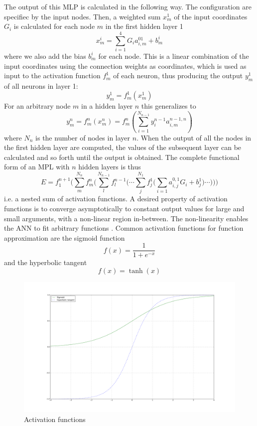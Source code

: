 \documentclass[twoside,english]{uiofysmaster}
\begin{document}
The output of this MLP is calculated in the following way. The configuration are specifiec by the input nodes.
Then, a weighted sum $x_m^1$ of the input coordinates ${G_i}$ is calculated for each node $m$ in the first hidden layer 1
\begin{equation}
 x_m^i = \sum_{i=1}^4 G_i a_{i,m}^{01} + b_m^i 
\end{equation}
where we also add the bias $b_m^i$ for each node. This is a linear combination of the input coordinates
using the connection weights as coordinates, which is used as input to the activation function $f_m^1$ of each neuron, thus
producing the output $y_m^1$ of all neurons in layer 1:
\begin{equation}
 y_m^1 = f_m^1(x_m^1)
\end{equation}
For an arbitrary node $m$ in a hidden layer $n$ this generalizes to
\begin{equation}
 y_m^n = f_m^n(x_m^n) = f_m^n\left(\sum_{i=1}^{N_{n-1}} y_i^{n-1}a_{i,m}^{n-1,n}\right)
\end{equation}
where $N_n$ is the number of nodes in layer $n$. When the output of all the nodes in the first hidden layer are computed,
the values of the subsequent layer can be calculated and so forth until the output is obtained. The complete functional form
of an MPL with $n$ hidden layers is thus
\begin{equation}
 E = f_1^{n+1}\biggr(\sum_m^{N_n}f_m^{n}\biggr(\sum_l^{N_{n-1}}f_l^{n-1}\biggr( \cdots \sum_j^{N_1} 
     f_j^1\biggr(\sum_{i=1}a_{i,j}^{0,1}G_i + b_j^1\biggr) \cdots \biggr)\biggr)\biggr)
     \label{completeNN}
\end{equation}
i.e. a nested sum of activation functions. A desired property of activation functions is to converge asymptotically
to constant output values for large and small arguments, with a non-linear region in-between. The non-linearity enables
the ANN to fit arbitrary functions \cite{Hornik89}. Common activation functions \cite{Rojas96} for 
function approximation are the sigmoid function
\begin{equation}
 f(x) = \frac{1}{1 + e^{-x}}
 \label{sigmoidActivationFunction}
\end{equation}
and the hyperbolic tangent
\begin{equation}
 f(x) = \tanh(x)
 \label{tanhActivationFunction}
\end{equation}
\begin{figure}[H]
\begin{center}
  \includegraphics[width = 0.7\linewidth]{Figures/Theory/activationFunctions.pdf}
  \caption{Activation functions}
  \label{fig:activations}
  \end{center}
\end{figure}
\end{document}
